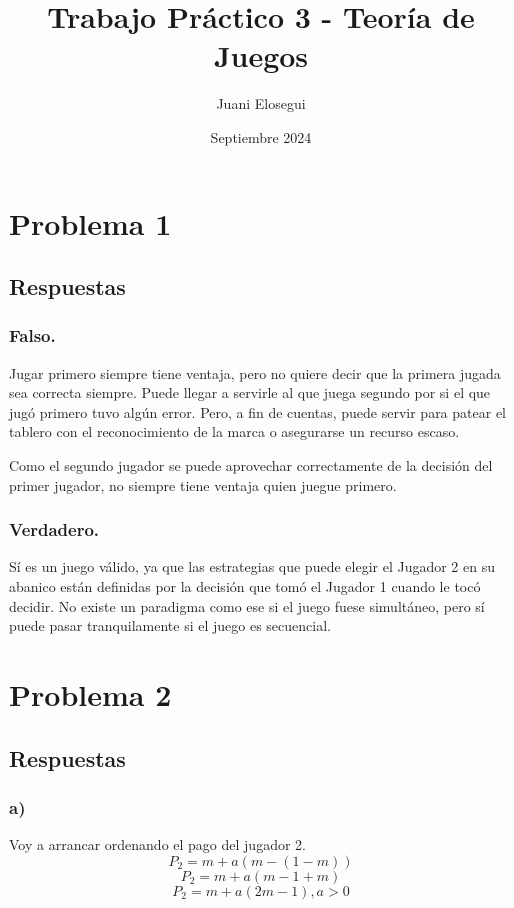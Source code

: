 \documentclass{article}
\title{Trabajo Práctico 3 - Teoría de Juegos}
\author{Juani Elosegui}
\date{Septiembre 2024}
\begin{document}
    \maketitle

    \newpage
    
    \section*{Problema 1}
        \subsection*{Respuestas}
            \subsubsection*{Falso.}
                Jugar primero siempre tiene ventaja, pero no quiere decir que la primera jugada sea correcta siempre. Puede llegar a servirle al que juega segundo por si el que jugó primero tuvo algún error. Pero, a fin de cuentas, puede servir para patear el tablero con el reconocimiento de la marca o asegurarse un recurso escaso.

                Como el segundo jugador se puede aprovechar correctamente de la decisión del primer jugador, no siempre tiene ventaja quien juegue primero.

            \subsubsection*{Verdadero.}
                Sí es un juego válido, ya que las estrategias que puede elegir el Jugador 2 en su abanico están definidas por la decisión que tomó el Jugador 1 cuando le tocó decidir. No existe un paradigma como ese si el juego fuese simultáneo, pero sí puede pasar tranquilamente si el juego es secuencial.

    \newpage

    \section*{Problema 2}
        \subsection*{Respuestas}
            \subsubsection*{a)}
                Voy a arrancar ordenando el pago del jugador 2.
                \[P_{2} = m+a(m-(1-m))\]
                \[P_{2} = m+a(m-1+m)\]
                \[P_{2} = m+a(2m-1), a>0\]
\end{document}

